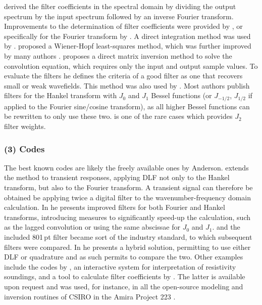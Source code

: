 \documentclass[paper,twocolumn,twoside]{geophysics}
\begin{document}
\cite{PhD.70.Ghosh} derived the filter coefficients in the spectral domain by
dividing the output spectrum by the input spectrum followed by an inverse
Fourier transform. Improvements to the determination of filter coefficients
were provided by \cite{EXG.75.ONeill, GEO.77.Nyman, GEO.82.Das}, or
specifically for the Fourier transform by \cite{GP.86.Nissen}. A direct
integration method was used by \cite{GP.76.Bichara, GP.78.Bernabini}.
\cite{GP.79.Koefoed} proposed a Wiener-Hopf least-squares method, which was
further improved by many authors \citep{GP.82.Guptasarma, GEO.1982.Murakami,
GP.97.Guptasarma}. \cite{GP.07.Kong} proposes a direct matrix inversion method
to solve the convolution equation, which requires only the input and output
sample values. To evaluate the filters he defines the criteria of a good filter
as one that recovers small or weak wavefields. This method was also used by
\cite{GEO.09.Key, GEO.12.Key}. Most authors publish filters for the Hankel
transform with $J_0$ and $J_1$ Bessel functions (or $J_{-1/2}$, $J_{1/2}$ if
applied to the Fourier sine/cosine transform), as all higher Bessel functions
can be rewritten to only use these two. \cite{GP.94.Mohsen} is one of the rare
cases which provides $J_2$ filter weights.

\subsubsection{(3) Codes}

The best known codes are likely the freely available ones by Anderson.
\cite{USGS.73.Anderson} extends the method to transient responses, applying DLF
not only to the Hankel transform, but also to the Fourier transform. A
transient signal can therefore be obtained be applying twice a digital filter
to the wavenumber-frequency domain calculation. In \cite{USGS.75.Anderson,
GEO.79.Anderson} he presents improved filters for both Fourier and Hankel
transforms, introducing measures to significantly speed-up the calculation,
such as the lagged convolution or using the same abscissae for $J_0$ and $J_1$.
\cite{TMS.82.Anderson} and the included 801\,pt filter became sort of the
industry standard, to which subsequent filters were compared. In
\cite{GEO.89.Anderson} he presents a hybrid solution, permitting to use either
DLF or quadrature and as such permits to compare the two. Other examples
include the codes by \cite{GP.75.Johansen}, an interactive system for
interpretation of resistivity soundings, and a tool to calculate filter
coefficients by \cite{GP.90.Christensen}. The latter is available upon request
and was used, for instance, in all the open-source modeling and inversion
routines of CSIRO in the Amira Project 223 \citep{ASEG.07.Raiche}. \newline
\end{document}
